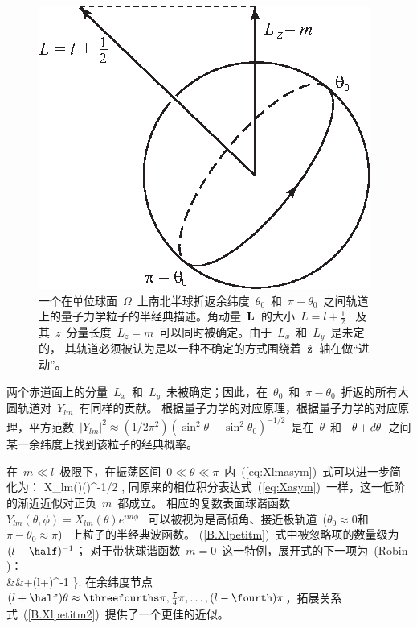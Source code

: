 \begin{figure}[!b]
\begin{center}
\includegraphics{../figures/appendixB/fig04.eps}
\end{center}
\caption[Ylm orbit]{\label{figure:Ylmasym}
一个在单位球面~$\Omega$~上南北半球折返余纬度~$\theta_0$~和~$\pi-\theta_0$~之间轨道上的量子力学粒子的半经典描述。角动量~${\bf L}$~的大小~$L=l+\textstyle{\frac{1}{2}}$~ 及其~$z$~分量长度~$L_z=m$~可以同时被确定。由于~$L_x$~和~$L_y$~是未定的，
其轨道必须被认为是以一种不确定的方式围绕着~$\hat{\bf z}$~轴在做“进动”。}
\end{figure}
两个赤道面上的分量~$L_x$~和~$L_y$~未被确定；因此，在~$\theta_0$~和~$\pi-\theta_0$~折返的所有大圆轨道对~$Y_{lm}$~有同样的贡献。
根据量子力学的对应原理，根据量子力学的对应原理，平方范数~$|Y_{lm}|^2\approx
(1/2\pi^2)(\sin^{2\!}\theta-\sin^{2\!} \theta_0)^{-1/2}$~是在~$\theta$~和~ $\theta+d\/\theta$~之间某一余纬度上找到该粒子的经典概率。

在~$m\ll l$~极限下，在振荡区间~$0\ll\theta\ll\pi$~内~(\ref{eq:Xlmasym})~式可以进一步简化为：
\eq \label{B.Xlpetitm}
X_{lm}(\theta)\approx{}(\sin\theta)^{-1/2}
\cos{},
\en
同原来的相位积分表达式~(\ref{eq:Xasym})~一样，这一低阶的渐近近似对正负~$m$~都成立。
相应的复数表面球谐函数~$Y_{lm}(\theta,\phi)=X_{lm}(\theta)e^{im\phi}$~
可以被视为是高倾角、接近极轨道~($\theta_0\approx 0$和$\pi-\theta_0\approx\pi$)~ 上粒子的半经典波函数。
(\ref{B.Xlpetitm})~式中被忽略项的数量级为~$(l+\half)^{-1}$；
对于带状球谐函数~$m=0$~这一特例，展开式的下一项为~(Robin \citeyear{robin58})：
\eqa \label{B.Xlpetitm2}
 \nonumber \\
&&\mbox{}+\eighth(l+\half)^{-1}\cot\theta
\sin{}\Big\}.
\ena
在余纬度节点~$(l+\half)\theta\approx \threefourths\pi,\mbox{$\frac{7}{4}$}\pi,\ldots,(l-\fourth)\pi$，拓展关系式~(\ref{B.Xlpetitm2})~提供了一个更佳的近似。
%

